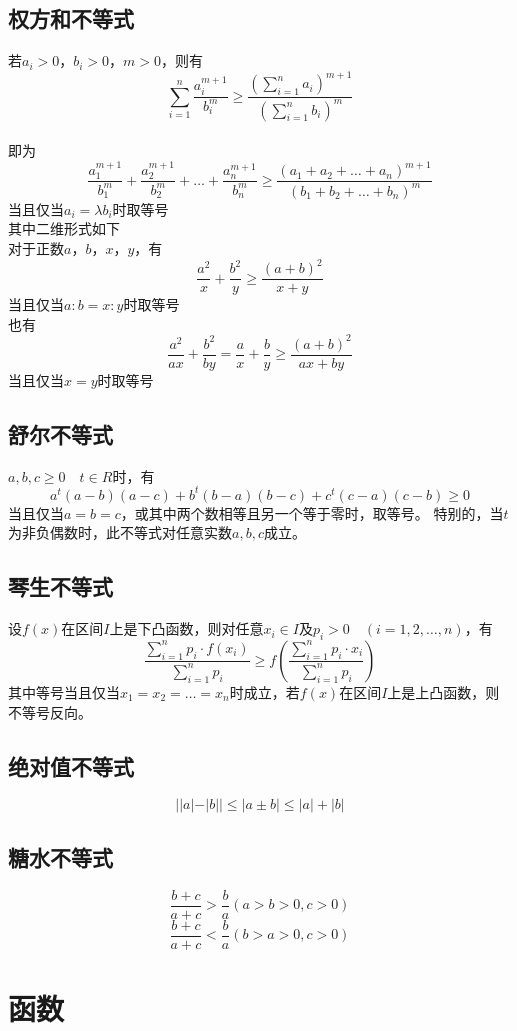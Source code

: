 \documentclass[UTF8]{ctexart}
\begin{document}
		\subsection{权方和不等式}
			若$a_i>0$，$b_i>0$，$m>0$，则有
			\[\sum\limits_{i=1}^{n}\frac{a_i^{m+1}}{b_i^{m}}\geq \frac{\left (\sum\limits_{i=1}^{n}a_i\right) ^{m+1}}{\left (\sum\limits_{i=1}^{n}b_i\right) ^m}\] \\
			即为
			\[\frac{a_1^{m+1}}{b_1^{m}}+\frac{a_2^{m+1}}{b_2^{m}}+\dots+\frac{a_n^{m+1}}{b_n^{m}}\geq \frac{(a_1+a_2+\dots+a_n)^{m+1}}{(b_1+b_2+\dots+b_n)^{m}}\]
			当且仅当$a_i=\lambda b_i$时取等号 \\
			其中二维形式如下\\
			对于正数$a$，$b$，$x$，$y$，有
			\[\frac{a^2}{x}+\frac{b^2}{y}\geq \frac{(a+b)^2}{x+y}\]
			当且仅当$a:b=x:y$时取等号\\
			也有
			\[\frac{a^2}{ax}+\frac{b^2}{by}=\frac{a}{x}+\frac{b}{y}\geq \frac{(a+b)^2}{ax+by}\]
			当且仅当$x=y$时取等号
		\subsection{舒尔不等式}
			$a,b,c\geq 0\quad t\in R$时，有
			\[a^t (a-b)(a-c)+b^t (b-a)(b-c)+c^t (c-a)(c-b)\geq 0\]
			当且仅当$a=b=c$，或其中两个数相等且另一个等于零时，取等号。
			特别的，当$t$为非负偶数时，此不等式对任意实数$a,b,c$成立。
		\subsection{琴生不等式}
			设$f(x)$在区间$I$上是下凸函数，则对任意$x_i\in I$及$p_i>0\quad (i=1,2,\dots,n)$，有
			\[ \frac{\sum\limits_{i=1}^{n}p_i\cdot f(x_i)}{\sum\limits_{i=1}^{n}p_i}\geq f \left (\frac{\sum\limits_{i=1}^{n}p_i\cdot x_i}{\sum\limits_{i=1}^{n}p_i} \right ) \]
			其中等号当且仅当$x_1=x_2=\dots=x_n$时成立，若$f(x)$在区间$I$上是上凸函数，则不等号反向。
		\subsection{绝对值不等式}
			\[||a|-|b|| \leq |a\pm b| \leq |a|+|b|\]
		\subsection{糖水不等式}
			\[\frac{b+c}{a+c}>\frac{b}{a}(a>b>0,c>0)\]
			\[\frac{b+c}{a+c}<\frac{b}{a}(b>a>0,c>0)\]
	\section{函数}
\end{document}
